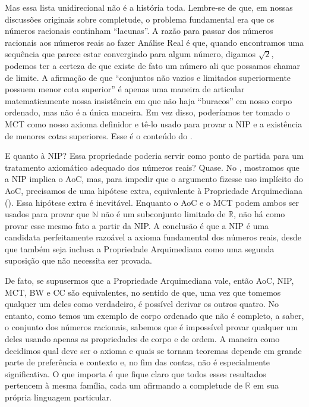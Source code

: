 Mas essa lista unidirecional não é a história toda. Lembre-se de que, em nossas discussões originais sobre completude, o problema fundamental era que os números racionais continham ``lacunas''. A razão para passar dos números racionais aos números reais ao fazer Análise Real 
é que, quando encontramos uma sequência que parece estar convergindo para algum número, 
digamos $\sqrt{2}$, podemos ter a certeza de que existe de fato um número ali 
que possamos chamar de limite. A afirmação de que 
``conjuntos não vazios e limitados superiormente possuem menor cota superior'' 
é apenas uma maneira de articular matematicamente nossa insistência em que 
não haja ``buracos'' em nosso corpo ordenado, mas não é a única maneira. 
Em vez disso, poderíamos ter tomado o MCT como nosso axioma definidor e tê-lo usado para provar a NIP e a existência de menores cotas superiores. Esse é o conteúdo do . 

E quanto à NIP? Essa propriedade poderia servir como ponto de partida para um tratamento axiomático adequado dos números reais? Quase. No , mostramos que a NIP implica o AoC, mas, para impedir que o argumento fizesse uso implícito do AoC, precisamos de uma hipótese extra, equivalente à Propriedade Arquimediana (). Essa hipótese extra é inevitável. Enquanto o AoC e o MCT podem ambos ser usados para provar que $\mathbb{N}$ não é um subconjunto limitado de $\mathbb{R}$, não há como provar esse mesmo fato a partir da NIP. A conclusão é que a NIP é uma candidata perfeitamente razoável a axioma fundamental dos números reais, desde que também seja inclusa a Propriedade Arquimediana como uma segunda suposição 
que não necessita ser provada.

De fato, se supusermos que a Propriedade Arquimediana vale, então AoC, NIP, MCT, BW e CC são equivalentes, no sentido de que, uma vez que tomemos qualquer um deles como verdadeiro, é possível derivar os outros quatro. No entanto, como temos um exemplo de corpo ordenado que não é completo, a saber, o conjunto dos números racionais, sabemos que é impossível provar qualquer um deles usando apenas as propriedades de corpo e de ordem. A maneira como decidimos qual deve ser o axioma e quais se tornam teoremas depende em grande parte de preferência e contexto e, no fim das contas, não é especialmente significativa. O que importa é que 
fique claro que todos esses resultados pertencem à mesma família, 
cada um afirmando a completude de $\mathbb{R}$ em sua própria linguagem particular. 

